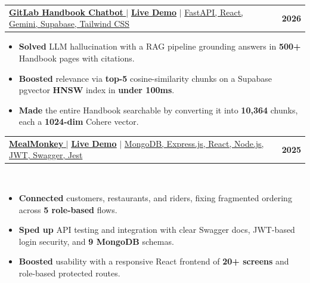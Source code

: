 \documentclass[letterpaper,11pt]{article}
\makeatletter
\newcommand{\resumeItem}[1]{
  \item\small{
    {#1 \vspace{-2pt}}
  }
}
\newcommand{\resumeProjectHeading}[2]{
    \item
    \begin{tabular*}{1.001\textwidth}{l@{\extracolsep{\fill}}r}
      \small#1 & \textbf{\small #2}\\
    \end{tabular*}\vspace{-7pt}
}
\newcommand{\resumeSubHeadingListEnd}{\end{itemize}}
\newcommand{\resumeItemListStart}{\begin{itemize}}
\makeatother
\begin{document}
\vspace{-0.15cm}

\resumeProjectHeading
{\href{https://github.com/yadnyesh001/gitlab-chatbot}{\textbf{\sffamily
 \large{\underline{GitLab Handbook Chatbot}}} \raisebox{-0.1\height}\faExternalLink} $|$
 \href{https://gitlab-chatbot-iota.vercel.app}{\textbf{\sffamily
 \large{\underline{Live Demo}}}} $|$ \sffamily
 \large{\underline{FastAPI, React, Gemini, Supabase, Tailwind CSS}}}{2026}
\vspace{-0.2cm}
\resumeItemListStart \setlength{\itemsep}{6pt} \resumeItem{\sffamily \normalsize{\textbf{Solved} LLM hallucination with a RAG pipeline grounding answers in \textbf{500+} Handbook pages with citations.}} \vspace{0.02cm} \resumeItem{\sffamily \normalsize{\textbf{Boosted} relevance via \textbf{top-5} cosine-similarity chunks on a Supabase pgvector \textbf{HNSW} index in \textbf{under 100ms}.}} \vspace{-0.40cm} \resumeItem{\sffamily \normalsize{\textbf{Made} the entire Handbook searchable by converting it into \textbf{10,364} chunks, each a \textbf{1024-dim} Cohere vector.}} \resumeSubHeadingListEnd


\vspace{-0.35cm}


\resumeProjectHeading {\href{https://github.com/yadnyesh001/MealMonkey}{\textbf{\sffamily \large{\underline{MealMonkey}}} \raisebox{-0.1\height}\faExternalLink} $|$ \href{https://mealmonkey-food.vercel.app/}{\textbf{\sffamily \large{\underline{Live Demo}}}} $|$ \sffamily \large{\underline{MongoDB, Express.js, React, Node.js, JWT, Swagger, Jest}}}{2025}\ \vspace{-0.15cm}
\resumeItemListStart \setlength{\itemsep}{6pt}

\resumeItem{\sffamily \normalsize{\textbf{Connected} customers, restaurants, and riders, fixing fragmented ordering across \textbf{5 role-based} flows.}}
\vspace{0.01cm}

\resumeItem{\sffamily \normalsize{\textbf{Sped up} API testing and integration with clear Swagger docs, JWT-based login security, and \textbf{9 MongoDB} schemas.}}

\vspace{0.01cm}

\resumeItem{\sffamily \normalsize{\textbf{Boosted} usability with a responsive React frontend of \textbf{20+ screens} and role-based protected routes.}}
\resumeSubHeadingListEnd
\end{document}
